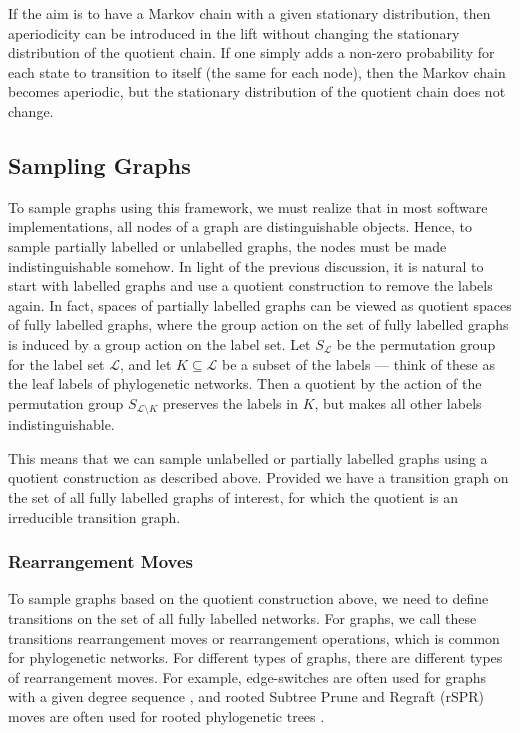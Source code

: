 \documentclass{article}
\theoremstyle{definition}
\newcommand{\rSPR}{\mathrm{rSPR}}
\begin{document}
If the aim is to have a Markov chain with a given stationary distribution, then aperiodicity can be introduced in the lift without changing the stationary distribution of the quotient chain. If one simply adds a non-zero probability for each state to transition to itself (the same for each node), then the Markov chain becomes aperiodic, but the stationary distribution of the quotient chain does not change. 


\subsection{Sampling Graphs}
To sample graphs using this framework, we must realize that in most software implementations, all nodes of a graph are distinguishable objects. Hence, to sample partially labelled or unlabelled graphs, the nodes must be made indistinguishable somehow. In light of the previous discussion, it is natural to start with labelled graphs and use a quotient construction to remove the labels again. In fact, spaces of partially labelled graphs can be viewed as quotient spaces of fully labelled graphs, where the group action on the set of fully labelled graphs is induced by a group action on the label set. Let $S_{\mathcal{L}}$ be the permutation group for the label set $\mathcal{L}$, and let $K\subseteq \mathcal{L}$ be a subset of the labels --- think of these as the leaf labels of phylogenetic networks. Then a quotient by the action of the permutation group $S_{\mathcal{L}\setminus K}$ preserves the labels in $K$, but makes all other labels indistinguishable.

This means that we can sample unlabelled or partially labelled graphs using a quotient construction as described above. 
Provided we have a transition graph on the set of all fully labelled graphs of interest, for which the quotient is an irreducible transition graph.

\subsubsection{Rearrangement Moves}\label{sec:rearrangement_move_proposals}
To sample graphs based on the quotient construction above, we need to define transitions on the set of all fully labelled networks. For graphs, we call these transitions rearrangement moves or rearrangement operations, which is common for phylogenetic networks. For different types of graphs, there are different types of rearrangement moves. For example, edge-switches are often used for graphs with a given degree sequence \cite[e.g.][]{GREENHILL20181, kleer2019nash}, and rooted Subtree Prune and Regraft ($\rSPR$) moves are often used for rooted phylogenetic trees \cite[e.g.][]{nascimento2017biologist}.
\end{document}
